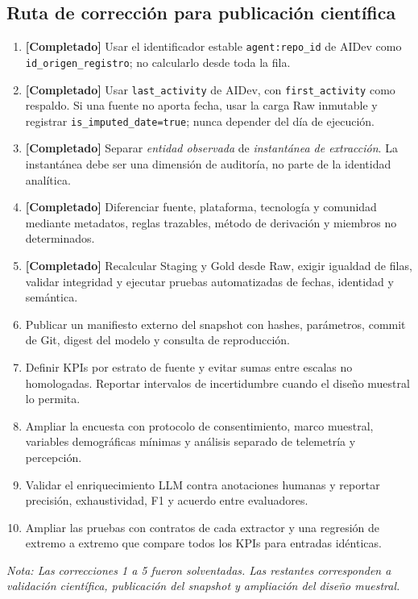 \documentclass[12pt,a4paper]{article}
\newcommand{\pathcode}[1]{\begingroup\small\ttfamily\nolinkurl{#1}\endgroup}
\begin{document}
\subsection{Ruta de corrección para publicación científica}

\begin{enumerate}[leftmargin=1.1cm]
  \item \textbf{[Completado]} Usar el identificador estable \pathcode{agent:repo_id} de AIDev como \pathcode{id_origen_registro}; no calcularlo desde toda la fila.
  \item \textbf{[Completado]} Usar \pathcode{last_activity} de AIDev, con \pathcode{first_activity} como respaldo. Si una fuente no aporta fecha, usar la carga Raw inmutable y registrar \pathcode{is_imputed_date=true}; nunca depender del día de ejecución.
  \item \textbf{[Completado]} Separar \emph{entidad observada} de \emph{instantánea de extracción}. La instantánea debe ser una dimensión de auditoría, no parte de la identidad analítica.
  \item \textbf{[Completado]} Diferenciar fuente, plataforma, tecnología y comunidad mediante metadatos, reglas trazables, método de derivación y miembros no determinados.
  \item \textbf{[Completado]} Recalcular Staging y Gold desde Raw, exigir igualdad de filas, validar integridad y ejecutar pruebas automatizadas de fechas, identidad y semántica.
  \item Publicar un manifiesto externo del snapshot con hashes, parámetros, commit de Git, digest del modelo y consulta de reproducción.
  \item Definir KPIs por estrato de fuente y evitar sumas entre escalas no homologadas. Reportar intervalos de incertidumbre cuando el diseño muestral lo permita.
  \item Ampliar la encuesta con protocolo de consentimiento, marco muestral, variables demográficas mínimas y análisis separado de telemetría y percepción.
  \item Validar el enriquecimiento LLM contra anotaciones humanas y reportar precisión, exhaustividad, F1 y acuerdo entre evaluadores.
  \item Ampliar las pruebas con contratos de cada extractor y una regresión de extremo a extremo que compare todos los KPIs para entradas idénticas.
\end{enumerate}

\textit{Nota: Las correcciones 1 a 5 fueron solventadas. Las restantes corresponden a validación científica, publicación del snapshot y ampliación del diseño muestral.}
\end{document}
